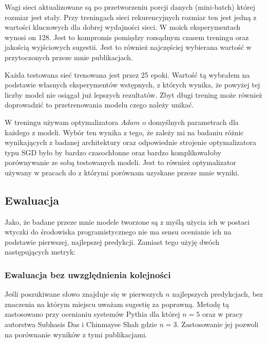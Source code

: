 Wagi sieci aktualizowane są po przetworzeniu porcji danych (mini-batch) której rozmiar jest stały. Przy treningach sieci rekurencyjnych rozmiar
ten jest jedną z wartości kluczowych dla dobrej wydajności sieci. W moich eksperymentach wynosi on 128. Jest to kompromis pomiędzy rozsądnym 
czasem treningu oraz jakością wyjściowych sugestii. Jest to również najczęściej wybierana wartość w przytoczonych przeze mnie publikacjach.

Każda testowana sieć trenowana jest przez 25 epoki. Wartość tą wybrałem na podstawie własnych eksperymentów wstępnych, z których wynika, że 
powyżej tej liczby model nie osiągał już lepszych rezultatów. Zbyt długi trening może również doprowadzić to przetrenowania modelu czego 
należy unikać. 

W treningu używam optymalizatora \begin{math}Adam\end{math} o domyślnych parametrach dla każdego z modeli.
Wybór ten wynika z tego, że zależy mi na badaniu różnic wynikających z badanej architektury oraz odpowiednie strojenie optymalizatora typu SGD
było by bardzo czasochłonne oraz bardzo komplikowałoby porównywanie ze sobą testowanych modeli. Jest to również optymalizator używany w pracach 
do z którymi porównam uzyskane przeze mnie wyniki.  

\subsection{Ewaluacja}
Jako, że badane przeze mnie modele tworzone są z myślą użycia ich w postaci wtyczki do środowiska programistycznego nie ma sensu ocenianie ich na podstawie pierwszej, najlepszej predykcji. 
Zamiast tego użyję dwóch następujących metryk: 
\subsubsection{Ewaluacja bez uwzględnienia kolejności}
Jeśli poszukiwane słowo znajduje się w pierwszych \begin{math}n\end{math} najlepszych predykcjach, bez znaczenia na którym miejscu uważam sugestię za poprawną. Metodę tą zastosowano przy ocenianiu systemów
Pythia \cite{pythia} dla której \begin{math}n = 5\end{math} oraz w pracy autorstwa Subhasis Das i Chinmayee Shah \cite{contextual_code_completion} gdzie \begin{math}n = 3\end{math}. Zastosowanie jej pozwoli na porównanie 
wyników z tymi publikacjami. 
